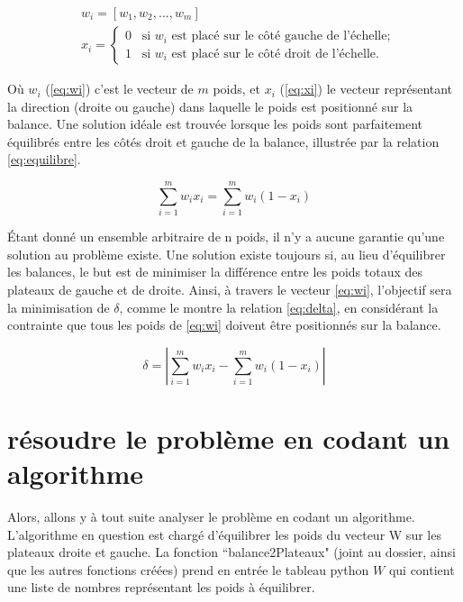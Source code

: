 \documentclass[12pt]{article} %
\begin{document}
\begin{align}
    &w_i = \left[w_1, w_2, ..., w_m \right] \label{eq:wi} \\
    &x_i = \begin{cases}
    0 \;\;\; \text{si $w_i$ est placé sur le côté gauche de l'échelle};\\
    1 \;\;\; \text{si $w_i$ est placé sur le côté droit de l'échelle}.
    \end{cases} \label{eq:xi}
\end{align}

Où $w_i$ (\ref{eq:wi}) c'est le vecteur de $m$ poids, et $x_i$ (\ref{eq:xi}) le vecteur représentant la direction (droite ou gauche) dans laquelle le poids est positionné sur la balance. Une solution idéale est trouvée lorsque les poids sont parfaitement équilibrés entre les côtés droit et gauche de la balance, illustrée par la relation \ref{eq:equilibre}.

\begin{equation}
    \sum_{i=1}^m w_i x_i = \sum_{i=1}^m w_i (1- x_i)
    \label{eq:equilibre}
\end{equation}

Étant donné un ensemble arbitraire de n poids, il n'y a aucune garantie qu'une solution au problème existe. Une solution existe toujours si, au lieu d'équilibrer les balances, le but est de minimiser la différence entre les poids totaux des plateaux de gauche et de droite. Ainsi, à travers le vecteur \ref{eq:wi}, l'objectif sera la minimisation de $\delta$, comme le montre la relation \ref{eq:delta}, en considérant la contrainte que tous les poids de \ref{eq:wi} doivent être positionnés sur la balance.

\begin{equation}
    \delta = \left| \sum_{i=1}^m w_i x_i - \sum_{i=1}^m w_i (1 - x_i) \right|
    \label{eq:delta}
\end{equation}

\section{résoudre le problème en codant un algorithme}

Alors, allons y à tout suite analyser le problème en codant un algorithme. L'algorithme en question est chargé d'équilibrer les poids du vecteur W sur les plateaux droite et gauche. 
La fonction ``balance2Plateaux" (joint au dossier, ainsi que les autres fonctions créées) prend en entrée le tableau python $W$ qui contient une liste de nombres représentant les poids à équilibrer. 
\end{document}
